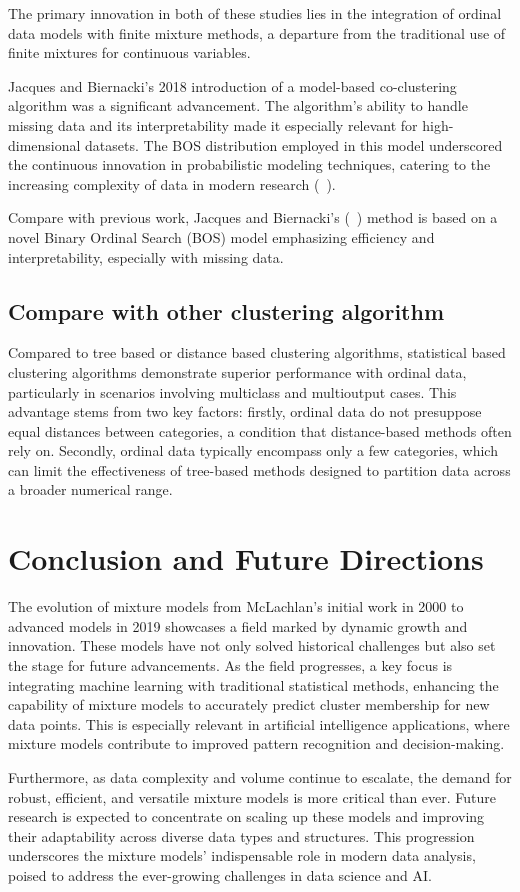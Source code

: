 \documentclass{article}
\begin{document}
The primary innovation in both of these studies lies in the integration of ordinal data models with finite mixture methods, a departure from the traditional use of finite mixtures for continuous variables.


Jacques and Biernacki's 2018 introduction of a model-based co-clustering algorithm was a significant advancement. The algorithm's ability to handle missing data and its interpretability made it especially relevant for high-dimensional datasets. The BOS distribution employed in this model underscored the continuous innovation in probabilistic modeling techniques, catering to the increasing complexity of data in modern research (~\cite{jacques2018model}).

Compare with previous work, Jacques and Biernacki's (~\cite{jacques2018model}) method is based on a novel Binary Ordinal Search (BOS) model emphasizing efficiency and interpretability, especially with missing data. 

\subsection*{Compare with other clustering algorithm}

Compared to tree based or distance based clustering algorithms, statistical based clustering algorithms demonstrate superior performance with ordinal data, particularly in scenarios involving multiclass and multioutput cases. 
This advantage stems from two key factors: firstly, ordinal data do not presuppose equal distances between categories, a condition that distance-based methods often rely on. Secondly, ordinal data typically encompass only a few categories, which can limit the effectiveness of tree-based methods designed to partition data across a broader numerical range.
\section{Conclusion and Future Directions}

The evolution of mixture models from McLachlan's initial work in 2000 to advanced models in 2019 showcases a field marked by dynamic growth and innovation. These models have not only solved historical challenges but also set the stage for future advancements. As the field progresses, a key focus is integrating machine learning with traditional statistical methods, enhancing the capability of mixture models to accurately predict cluster membership for new data points. This is especially relevant in artificial intelligence applications, where mixture models contribute to improved pattern recognition and decision-making.

Furthermore, as data complexity and volume continue to escalate, the demand for robust, efficient, and versatile mixture models is more critical than ever. Future research is expected to concentrate on scaling up these models and improving their adaptability across diverse data types and structures. This progression underscores the mixture models' indispensable role in modern data analysis, poised to address the ever-growing challenges in data science and AI.

\printbibliography
\end{document}

